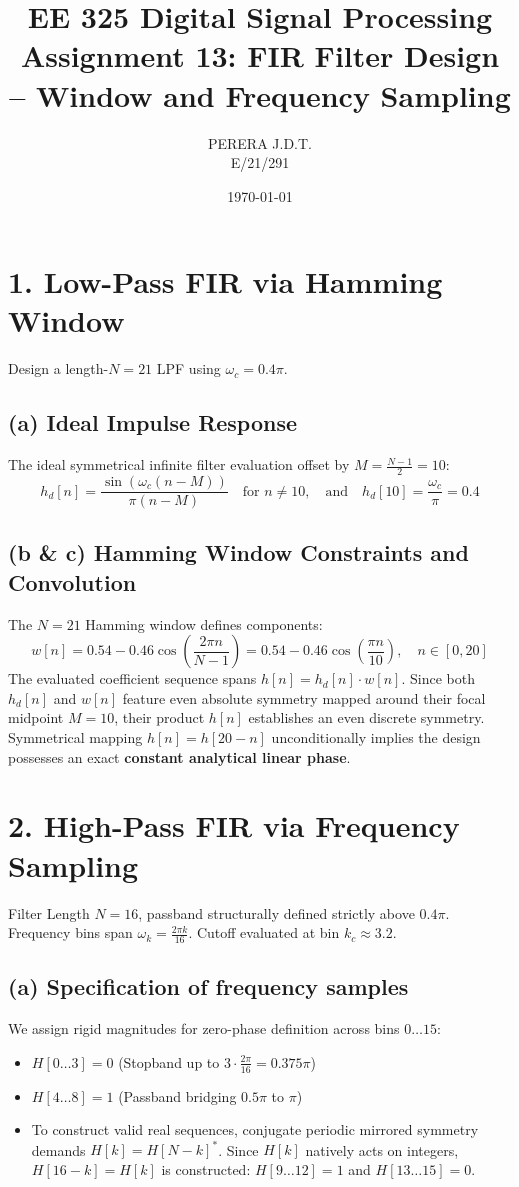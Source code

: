 \documentclass[11pt, a4paper]{article}
\title{EE 325 Digital Signal Processing \\ Assignment 13: FIR Filter Design – Window and Frequency Sampling}
\author{PERERA J.D.T. \\ E/21/291}
\date{\today}
\begin{document}
\maketitle

\section{1. Low-Pass FIR via Hamming Window}
Design a length-$N=21$ LPF using $\omega_c = 0.4\pi$.

\subsection{(a) Ideal Impulse Response}
The ideal symmetrical infinite filter evaluation offset by $M = \frac{N-1}{2} = 10$:
$$ h_d[n] = \frac{\sin(\omega_c (n - M))}{\pi (n - M)} \quad \text{for } n \neq 10, \quad \text{and} \quad h_d[10] = \frac{\omega_c}{\pi} = 0.4 $$

\subsection{(b \& c) Hamming Window Constraints and Convolution}
The $N=21$ Hamming window defines components:
$$ w[n] = 0.54 - 0.46 \cos\left( \frac{2\pi n}{N-1} \right) = 0.54 - 0.46 \cos\left( \frac{\pi n}{10} \right), \quad n \in [0, 20] $$
The evaluated coefficient sequence spans $h[n] = h_d[n] \cdot w[n]$. 
Since both $h_d[n]$ and $w[n]$ feature even absolute symmetry mapped around their focal midpoint $M=10$, their product $h[n]$ establishes an even discrete symmetry. Symmetrical mapping $h[n] = h[20-n]$ unconditionally implies the design possesses an exact \textbf{constant analytical linear phase}.

\section{2. High-Pass FIR via Frequency Sampling}
Filter Length $N=16$, passband structurally defined strictly above $0.4\pi$. Frequency bins span $\omega_k = \frac{2\pi k}{16}$. Cutoff evaluated at bin $k_c \approx 3.2$.

\subsection{(a) Specification of frequency samples}
We assign rigid magnitudes for zero-phase definition across bins $0 \ldots 15$:
\begin{itemize}
    \item $H[0\ldots3] = 0$ (Stopband up to $3 \cdot \frac{2\pi}{16} = 0.375\pi$)
    \item $H[4\ldots8] = 1$ (Passband bridging $0.5\pi$ to $\pi$)
    \item To construct valid real sequences, conjugate periodic mirrored symmetry demands $H[k] = H[N-k]^*$. Since $H[k]$ natively acts on integers, $H[16-k] = H[k]$ is constructed: $H[9\dots12] = 1$ and $H[13\ldots15] = 0$.
\end{itemize}
\end{document}
